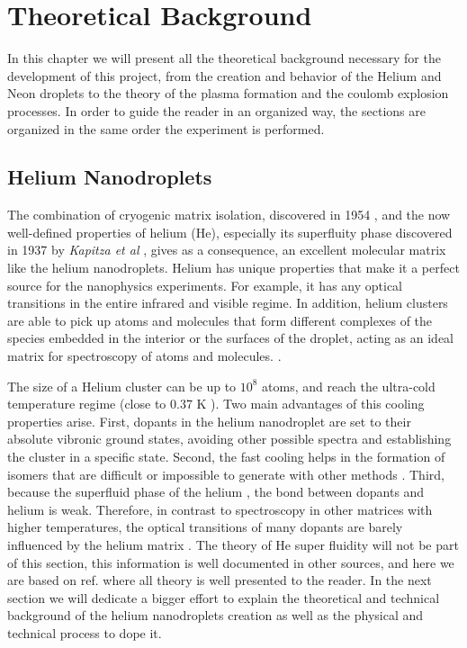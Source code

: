\chapter{Theoretical Background}

In this chapter we will present all the theoretical background necessary for the development of this project, from the creation and behavior of the Helium and Neon droplets to the theory of the plasma formation and the coulomb explosion processes. In order to guide the reader in an organized way, the sections are organized in the same order the experiment is performed.


\section{Helium Nanodroplets}

The combination of cryogenic matrix isolation, discovered in 1954 \cite{whittle_matrix_1954}, and the now well-defined properties of helium (He), especially its superfluity phase discovered in 1937 by \textit{Kapitza et al} \cite{kapitza_viscosity_1938}, gives as a consequence, an excellent molecular matrix like the helium nanodroplets.
Helium has unique properties that make it a perfect source for the nanophysics experiments. For example, it has any optical transitions in the entire infrared and visible regime. In addition, helium clusters are able to pick up atoms and molecules that form different complexes of the species embedded in the interior or the surfaces of the droplet, acting as an ideal matrix for spectroscopy of atoms and molecules. \cite{stienkemeier_spectroscopy_2006}\cite{toennies_superfluid_2004}.

The size of a Helium cluster can be up to $10^{8}$ atoms, and reach the ultra-cold temperature regime (close to 0.37 K \cite{toennies_spectroscopy_1998})\cite{enss_low-temperature_2005}.
Two main advantages of this cooling properties arise. First, dopants in the helium nanodroplet are set to their absolute vibronic ground states, avoiding other possible spectra and establishing the cluster in a specific state. Second, the fast cooling helps in the formation of isomers that are difficult or impossible to generate with other methods \cite{nauta_nonequilibrium_1999}. Third, because the superfluid phase of the helium \cite{grebenev_superfluidity_1998}, the bond between dopants and helium is weak. Therefore, in contrast to spectroscopy in other matrices with higher temperatures, the optical transitions of many dopants are barely influenced by the helium matrix \cite{toennies_superfluid_2004}. 
The theory of He super fluidity will not be part of this section, this information is well documented in other sources, and here we are based on ref.\cite{enss_low-temperature_2005} where all theory is well presented to the reader. In the next section we will dedicate a bigger effort to explain the theoretical and technical background of the helium nanodroplets creation as well as the physical and technical process to dope it. 

